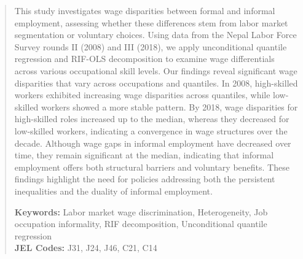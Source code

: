 \begin{abstract}	
\noindent 
This study investigates wage disparities between formal and informal employment, assessing whether these differences stem from labor market segmentation or voluntary choices. Using data from the Nepal Labor Force Survey rounds II (2008) and III (2018), we apply unconditional quantile regression and RIF-OLS decomposition to examine wage differentials across various occupational skill levels. Our findings reveal significant wage disparities that vary across occupations and quantiles. In 2008, high-skilled workers exhibited increasing wage disparities across quantiles, while low-skilled workers showed a more stable pattern. By 2018, wage disparities for high-skilled roles increased up to the median, whereas they decreased for low-skilled workers, indicating a convergence in wage structures over the decade. Although wage gaps in informal employment have decreased over time, they remain significant at the median, indicating that informal employment offers both structural barriers and voluntary benefits. These findings highlight the need for policies addressing both the persistent inequalities and the duality of informal employment.

\par
\vspace{.1in}
\noindent\textbf{Keywords:} Labor market wage discrimination, Heterogeneity, Job occupation informality, RIF decomposition, Unconditional quantile regression \\
\noindent\textbf{JEL Codes:} J31, J24, J46, C21, C14
\bigskip
\end{abstract}